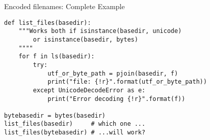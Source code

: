 \begin{frame}[fragile]{Encoded filenames: Complete Example}
\begin{verbatim}
def list_files(basedir):
    """Works both if isinstance(basedir, unicode)
        or isinstance(basedir, bytes)
    """"
    for f in ls(basedir):
        try:
            utf_or_byte_path = pjoin(basedir, f)
            print("file: {!r}".format(utf_or_byte_path))
        except UnicodeDecodeError as e:
            print("Error decoding {!r}".format(f))

bytebasedir = bytes(basedir)
list_files(basedir)     # which one ...
list_files(bytebasedir) # ...will work?
    
\end{verbatim}
\end{frame}

